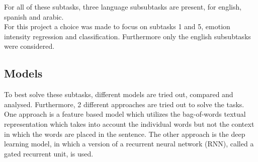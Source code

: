 For all of these subtasks, three language subsubtasks are present, for english, spanish and arabic.\\ 
For this project a choice was made to focus on subtasks 1 and 5, emotion intensity regression and classification. Furthermore only the  english subsubtasks were considered.
\subsection{Models}
To best solve these subtasks, different models are tried out, compared and analysed. Furthermore, 2 different approaches are tried out to solve the tasks. One approach is a feature based model which utilizes the bag-of-words textual representation which takes into account the individual words but not the context in which the words are placed in the sentence. The other approach is the deep learning model, in which a version of a recurrent neural network (RNN), called a gated recurrent unit, is used.

